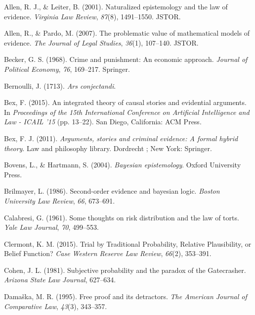 \documentclass[11pt,dvipsnames,enabledeprecatedfontcommands]{scrartcl}
\begin{document}
\leavevmode\hypertarget{ref-allen2001naturalized}{}%
Allen, R. J., \& Leiter, B. (2001). Naturalized epistemology and the law
of evidence. \emph{Virginia Law Review}, \emph{87}(8), 1491--1550.
JSTOR.

\leavevmode\hypertarget{ref-allen2007problematic}{}%
Allen, R., \& Pardo, M. (2007). The problematic value of mathematical
models of evidence. \emph{The Journal of Legal Studies}, \emph{36}(1),
107--140. JSTOR.

\leavevmode\hypertarget{ref-becker1968crime}{}%
Becker, G. S. (1968). Crime and punishment: An economic approach.
\emph{Journal of Political Economy}, \emph{76}, 169--217. Springer.

\leavevmode\hypertarget{ref-Bernoulli1713Ars-conjectandi}{}%
Bernoulli, J. (1713). \emph{Ars conjectandi}.

\leavevmode\hypertarget{ref-bex2015IntegratedTheoryCausal}{}%
Bex, F. (2015). An integrated theory of causal stories and evidential
arguments. In \emph{Proceedings of the 15th International Conference on
Artificial Intelligence and Law - ICAIL '15} (pp. 13--22). San Diego,
California: ACM Press.

\leavevmode\hypertarget{ref-bex2011ArgumentsStoriesCriminal}{}%
Bex, F. J. (2011). \emph{Arguments, stories and criminal evidence: A
formal hybrid theory}. Law and philosophy library. Dordrecht ; New York:
Springer.

\leavevmode\hypertarget{ref-bovens2004bayesian}{}%
Bovens, L., \& Hartmann, S. (2004). \emph{Bayesian epistemology}. Oxford
University Press.

\leavevmode\hypertarget{ref-brilmayer1986}{}%
Brilmayer, L. (1986). Second-order evidence and bayesian logic.
\emph{Boston University Law Review}, \emph{66}, 673--691.

\leavevmode\hypertarget{ref-Calabresi1961}{}%
Calabresi, G. (1961). Some thoughts on risk distribution and the law of
torts. \emph{Yale Law Journal}, \emph{70}, 499--553.

\leavevmode\hypertarget{ref-clermont2015TrialTraditionalProbability}{}%
Clermont, K. M. (2015). Trial by Traditional Probability, Relative
Plausibility, or Belief Function? \emph{Case Western Reserve Law
Review}, \emph{66}(2), 353--391.

\leavevmode\hypertarget{ref-Cohen81}{}%
Cohen, J. L. (1981). Subjective probability and the paradox of the
Gatecrasher. \emph{Arizona State Law Journal}, 627--634.

\leavevmode\hypertarget{ref-damaska1996free}{}%
Damaška, M. R. (1995). Free proof and its detractors. \emph{The American
Journal of Comparative Law}, \emph{43}(3), 343--357.
\end{document}

